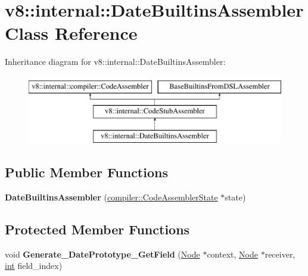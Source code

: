 \hypertarget{classv8_1_1internal_1_1DateBuiltinsAssembler}{}\section{v8\+:\+:internal\+:\+:Date\+Builtins\+Assembler Class Reference}
\label{classv8_1_1internal_1_1DateBuiltinsAssembler}
Inheritance diagram for v8\+:\+:internal\+:\+:Date\+Builtins\+Assembler\+:\begin{figure}[H]
\begin{center}
\leavevmode
\includegraphics[height=3.000000cm]{classv8_1_1internal_1_1DateBuiltinsAssembler}
\end{center}
\end{figure}
\subsection*{Public Member Functions}
\begin{DoxyCompactItemize}
\item 
\mbox{\label{classv8_1_1internal_1_1DateBuiltinsAssembler_a9eed3a8fe77f9d01b19afb85c543c3b2}} 
{\bfseries Date\+Builtins\+Assembler} (\mbox{\hyperlink{classv8_1_1internal_1_1compiler_1_1CodeAssemblerState}{compiler\+::\+Code\+Assembler\+State}} $\ast$state)
\end{DoxyCompactItemize}
\subsection*{Protected Member Functions}
\begin{DoxyCompactItemize}
\item 
\mbox{\label{classv8_1_1internal_1_1DateBuiltinsAssembler_a5b84e922a87309f329d32d746190e216}} 
void {\bfseries Generate\+\_\+\+Date\+Prototype\+\_\+\+Get\+Field} (\mbox{\hyperlink{classv8_1_1internal_1_1compiler_1_1Node}{Node}} $\ast$context, \mbox{\hyperlink{classv8_1_1internal_1_1compiler_1_1Node}{Node}} $\ast$receiver, \mbox{\hyperlink{classint}{int}} field\+\_\+index)
\end{DoxyCompactItemize}
